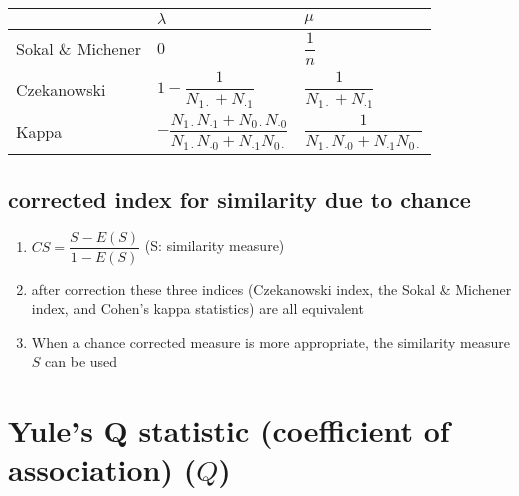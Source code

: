 \renewcommand{\arraystretch}{2.7}
\begin{table}[H]
    \centering
    \begin{tabular}{|l|l|l|}
        \hline
    
        & $\lambda$ & $\mu$ \\
        \hline
    
        Sokal \& Michener \cite{ism-1} &  $0$ & $\dfrac{1}{n}$ \\
        \hline
    
        Czekanowski \cite{ism-1} & $1 - \dfrac{1}{N_{1\cdot} + N_{\cdot 1}}$ & $\dfrac{1}{N_{1\cdot} + N_{\cdot 1}}$ \\
        \hline

        Kappa \cite{ism-1} & $-\dfrac{N_{1\cdot }N_{\cdot 1} + N_{0\cdot }N_{\cdot 0}}{N_{1\cdot }N_{\cdot 0} + N_{\cdot 1}N_{0\cdot }}$ & $\dfrac{1}{N_{1\cdot }N_{\cdot 0} + N_{\cdot 1}N_{0\cdot }}$ \\
        \hline

        
    \end{tabular}
\end{table}

\subsection{corrected index for similarity due to chance \cite{ism-1}} \label{corrected index for similarity due to chance}

\begin{enumerate}
    \item[] $CS = \dfrac{S - E(S)}{1 - E(S)}$
    \hfill
    (S: similarity measure)

    \item after correction these three indices (Czekanowski index, the Sokal \& Michener index, and Cohen’s kappa statistics) are all equivalent

    \item When a chance corrected measure is more appropriate, the similarity measure $S$ can be used
\end{enumerate}

\section{Yule’s Q statistic (coefficient of association) ($Q$) \cite{ism-1}}\label{Yule’s Q statistic (coefficient of association)}

